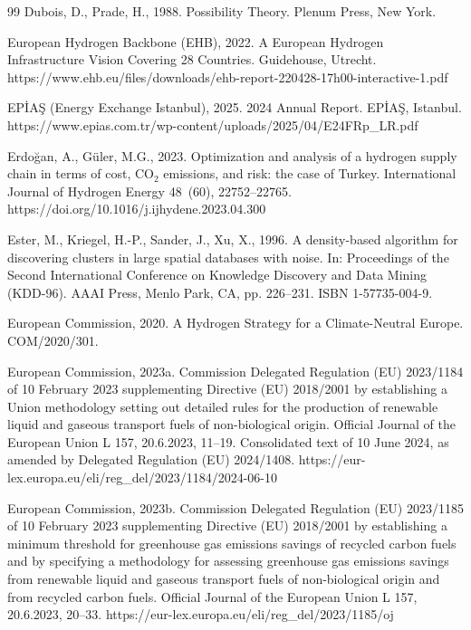 \documentclass[preprint,12pt,authoryear]{elsarticle}
\begin{document}
\begin{thebibliography}{99}
Dubois, D., Prade, H., 1988. Possibility Theory. Plenum Press, New York.

European Hydrogen Backbone (EHB), 2022. A European Hydrogen Infrastructure Vision Covering 28 Countries. Guidehouse, Utrecht. https://www.ehb.eu/files/downloads/ehb-report-220428-17h00-interactive-1.pdf

EP{\.I}A{\c{S}} (Energy Exchange Istanbul), 2025. 2024 Annual Report. EP{\.I}A{\c{S}}, Istanbul. https://www.epias.com.tr/wp-content/uploads/2025/04/E24FRp\_LR.pdf

Erdo{\u{g}}an, A., G{\"u}ler, M.G., 2023. Optimization and analysis of a hydrogen supply chain in terms of cost, CO$_2$ emissions, and risk: the case of Turkey. International Journal of Hydrogen Energy 48~(60), 22752--22765. https://doi.org/10.1016/j.ijhydene.2023.04.300

Ester, M., Kriegel, H.-P., Sander, J., Xu, X., 1996. A density-based algorithm for discovering clusters in large spatial databases with noise. In: Proceedings of the Second International Conference on Knowledge Discovery and Data Mining (KDD-96). AAAI Press, Menlo Park, CA, pp. 226--231. ISBN 1-57735-004-9.

European Commission, 2020. A Hydrogen Strategy for a Climate-Neutral Europe. COM/2020/301.

European Commission, 2023a. Commission Delegated Regulation (EU) 2023/1184 of 10 February 2023 supplementing Directive (EU) 2018/2001 by establishing a Union methodology setting out detailed rules for the production of renewable liquid and gaseous transport fuels of non-biological origin. Official Journal of the European Union L 157, 20.6.2023, 11--19. Consolidated text of 10 June 2024, as amended by Delegated Regulation (EU) 2024/1408. https://eur-lex.europa.eu/eli/reg\_del/2023/1184/2024-06-10

European Commission, 2023b. Commission Delegated Regulation (EU) 2023/1185 of 10 February 2023 supplementing Directive (EU) 2018/2001 by establishing a minimum threshold for greenhouse gas emissions savings of recycled carbon fuels and by specifying a methodology for assessing greenhouse gas emissions savings from renewable liquid and gaseous transport fuels of non-biological origin and from recycled carbon fuels. Official Journal of the European Union L 157, 20.6.2023, 20--33. https://eur-lex.europa.eu/eli/reg\_del/2023/1185/oj


\end{thebibliography}
\end{document}
